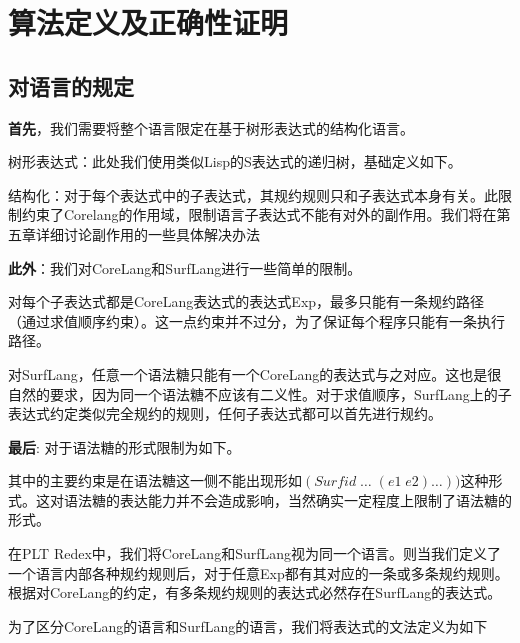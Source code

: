 \pagestyle{fancy}
\normalsize
\linespread{1.5}\selectfont
\chapter{算法定义及正确性证明}

\section{对语言的规定}
{\bfseries 首先}，我们需要将整个语言限定在基于树形表达式的结构化语言。

树形表达式：此处我们使用类似Lisp的S表达式的递归树，基础定义如下。


\label{mark:struct}结构化：对于每个表达式中的子表达式，其规约规则只和子表达式本身有关。此限制约束了Corelang的作用域，限制语言子表达式不能有对外的副作用。我们将在第五章详细讨论副作用的一些具体解决办法

{\bfseries 此外}：我们对CoreLang和SurfLang进行一些简单的限制。

对每个子表达式都是CoreLang表达式的表达式Exp，最多只能有一条规约路径（通过求值顺序约束）。这一点约束并不过分，为了保证每个程序只能有一条执行路径。

对SurfLang，任意一个语法糖只能有一个CoreLang的表达式与之对应。这也是很自然的要求，因为同一个语法糖不应该有二义性。对于求值顺序，SurfLang上的子表达式约定类似完全规约的规则，任何子表达式都可以首先进行规约。

{\bfseries 最后}: 对于语法糖的形式限制为如下。

其中的主要约束是在语法糖这一侧不能出现形如$(Surfid\;\ldots\;(e1\;e2)\ldots))$这种形式。这对语法糖的表达能力并不会造成影响，当然确实一定程度上限制了语法糖的形式。

在PLT Redex中，我们将CoreLang和SurfLang视为同一个语言。则当我们定义了一个语言内部各种规约规则后，对于任意Exp都有其对应的一条或多条规约规则。根据对CoreLang的约定，有多条规约规则的表达式必然存在SurfLang的表达式。

为了区分CoreLang的语言和SurfLang的语言，我们将表达式的文法定义为如下

